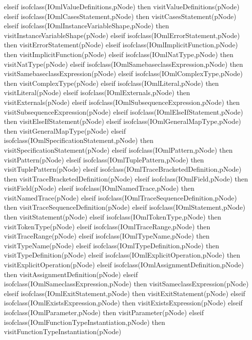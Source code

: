 \begin{vdm_al}
      elseif isofclass(IOmlValueDefinitions,pNode) then visitValueDefinitions(pNode)
      elseif isofclass(IOmlCasesStatement,pNode) then visitCasesStatement(pNode)
      elseif isofclass(IOmlInstanceVariableShape,pNode) then visitInstanceVariableShape(pNode)
      elseif isofclass(IOmlErrorStatement,pNode) then visitErrorStatement(pNode)
      elseif isofclass(IOmlImplicitFunction,pNode) then visitImplicitFunction(pNode)
      elseif isofclass(IOmlNatType,pNode) then visitNatType(pNode)
      elseif isofclass(IOmlSamebaseclassExpression,pNode) then visitSamebaseclassExpression(pNode)
      elseif isofclass(IOmlComplexType,pNode) then visitComplexType(pNode)
      elseif isofclass(IOmlLiteral,pNode) then visitLiteral(pNode)
      elseif isofclass(IOmlExternals,pNode) then visitExternals(pNode)
      elseif isofclass(IOmlSubsequenceExpression,pNode) then visitSubsequenceExpression(pNode)
      elseif isofclass(IOmlElseIfStatement,pNode) then visitElseIfStatement(pNode)
      elseif isofclass(IOmlGeneralMapType,pNode) then visitGeneralMapType(pNode)
      elseif isofclass(IOmlSpecificationStatement,pNode) then visitSpecificationStatement(pNode)
      elseif isofclass(IOmlPattern,pNode) then visitPattern(pNode)
      elseif isofclass(IOmlTuplePattern,pNode) then visitTuplePattern(pNode)
      elseif isofclass(IOmlTraceBracketedDefinition,pNode) then visitTraceBracketedDefinition(pNode)
      elseif isofclass(IOmlField,pNode) then visitField(pNode)
      elseif isofclass(IOmlNamedTrace,pNode) then visitNamedTrace(pNode)
      elseif isofclass(IOmlTraceSequenceDefinition,pNode) then visitTraceSequenceDefinition(pNode)
      elseif isofclass(IOmlStatement,pNode) then visitStatement(pNode)
      elseif isofclass(IOmlTokenType,pNode) then visitTokenType(pNode)
      elseif isofclass(IOmlTraceRange,pNode) then visitTraceRange(pNode)
      elseif isofclass(IOmlTypeName,pNode) then visitTypeName(pNode)
      elseif isofclass(IOmlTypeDefinition,pNode) then visitTypeDefinition(pNode)
      elseif isofclass(IOmlExplicitOperation,pNode) then visitExplicitOperation(pNode)
      elseif isofclass(IOmlAssignmentDefinition,pNode) then visitAssignmentDefinition(pNode)
      elseif isofclass(IOmlSameclassExpression,pNode) then visitSameclassExpression(pNode)
      elseif isofclass(IOmlExitStatement,pNode) then visitExitStatement(pNode)
      elseif isofclass(IOmlExistsExpression,pNode) then visitExistsExpression(pNode)
      elseif isofclass(IOmlParameter,pNode) then visitParameter(pNode)
      elseif isofclass(IOmlFunctionTypeInstantiation,pNode) then visitFunctionTypeInstantiation(pNode)

\end{vdm_al}

